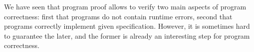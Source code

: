 We have seen that program proof allows to verify two main aspects
of program correctness: first that programs do not contain runtime
errors, second that programs correctly implement given specification.
However, it is sometimes hard to guarantee the later, and the former
is already an interesting step for program correctness.
